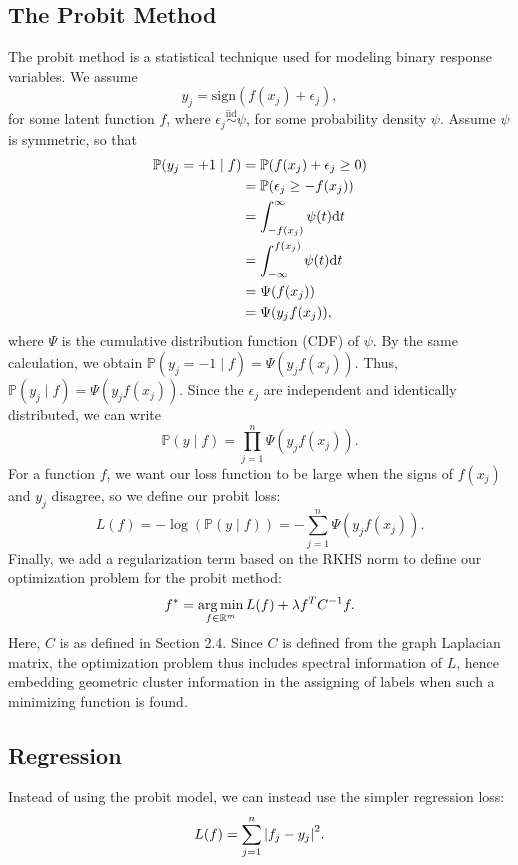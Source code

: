 \documentclass[12pt]{amsart}
\newcommand{\iid}{\overset{\mathrm{iid}}{\sim}}
\begin{document}
\subsection{The Probit Method}\label{Sec:Probit}
The probit method is a statistical technique used for modeling binary response variables. We assume
\[y_j = \mathrm{sign}(f(x_j) + \epsilon_j),\]
for some latent function $f$, where $\epsilon_j\iid \psi$, for some probability density $\psi$. Assume $\psi$ is symmetric, so that
\begin{align*}
	\mathbb{P}(y_j = +1 \mid f) &= \mathbb{P}(f(x_j) + \epsilon_j \geq 0) \\
	&= \mathbb{P}(\epsilon_j \geq - f(x_j)  ) \\
	&= \int_{-f(x_j)}^\infty \psi(t) {\mathrm{d}} t \\
	&= \int_{-\infty}^{f(x_j)} \psi(t) {\mathrm{d}} t \\
	&= \Psi(f(x_j)) \\
	&= \Psi(y_jf(x_j)),
\end{align*}
where $\Psi$ is the cumulative distribution function (CDF) of $\psi$. By the same calculation, we obtain $\mathbb{P}(y_j = -1 \mid f) = \Psi(y_jf(x_j))$. Thus, $\mathbb{P}(y_j \mid f) = \Psi(y_jf(x_j))$. Since the $\epsilon_j$ are independent and identically distributed, we can write
\[\mathbb{P}(y  \mid f) = \prod_{j = 1}^n \Psi(y_jf(x_j)).\]
For a function $f$, we want our loss function to be large when the signs of $f(x_j)$ and $y_j$  disagree, so we define our probit loss:
\[L(f) = -\log(\mathbb{P}(y\mid f)) = -\sum_{j = 1}^n \Psi(y_jf(x_j)).\]
Finally, we add a regularization term based on the RKHS norm to define our optimization problem for the probit method:
\[f^* = \operatorname*{arg\,min}_{f \in \mathbb{R}^{m}} L(f) + \lambda f^{T}C^{-1}f.\]
Here, $C$ is as defined in Section 2.4. Since $C$ is defined from the graph Laplacian matrix, the optimization problem thus includes spectral information of $L$, hence embedding geometric cluster information in the assigning of labels when such a minimizing function is found.

\subsection{Regression}
Instead of using the probit model, we can instead use the simpler regression loss:
\[L(f) = \sum_{j = 1}^n {\left|f_j - y_j\right|}^2.\]
\end{document}
